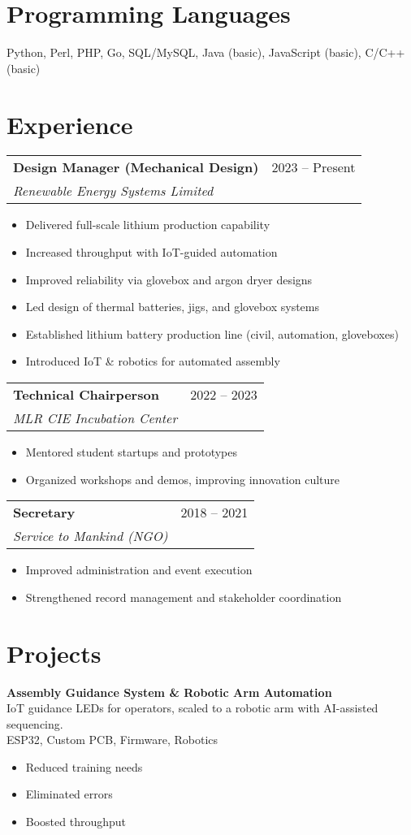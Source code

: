 \documentclass[12pt,a4paper]{article}
\makeatletter
\newcommand{\ExperienceEntry}[3]{%
  \noindent\begin{tabular*}{\linewidth}{@{}l@{\extracolsep{\fill}}r@{}}
    \textbf{#1} & {\small #3}\\[-2pt]
    \textit{#2} & \\
  \end{tabular*}\par
}
\makeatother
\begin{document}
\section*{Programming Languages}
Python, Perl, PHP, Go, SQL/MySQL, Java (basic), JavaScript (basic), C/C++ (basic)

\section*{Experience}
\ExperienceEntry{Design Manager (Mechanical Design)}{Renewable Energy Systems Limited}{2023 – Present}
\begin{itemize}
\item Delivered full-scale lithium production capability
\item Increased throughput with IoT-guided automation
\item Improved reliability via glovebox and argon dryer designs
\item Led design of thermal batteries, jigs, and glovebox systems
\item Established lithium battery production line (civil, automation, gloveboxes)
\item Introduced IoT \& robotics for automated assembly
\end{itemize}


\ExperienceEntry{Technical Chairperson}{MLR CIE Incubation Center}{2022 – 2023}
\begin{itemize}
\item Mentored student startups and prototypes
\item Organized workshops and demos, improving innovation culture
\end{itemize}


\ExperienceEntry{Secretary}{Service to Mankind (NGO)}{2018 – 2021}
\begin{itemize}
\item Improved administration and event execution
\item Strengthened record management and stakeholder coordination
\end{itemize}


\section*{Projects}
\textbf{Assembly Guidance System \& Robotic Arm Automation} \\ IoT guidance LEDs for operators, scaled to a robotic arm with AI-assisted sequencing. \\ \textcolor{muted}{ESP32, Custom PCB, Firmware, Robotics}
\begin{itemize}
  \item Reduced training needs
  \item Eliminated errors
  \item Boosted throughput
\end{itemize}
\end{document}
